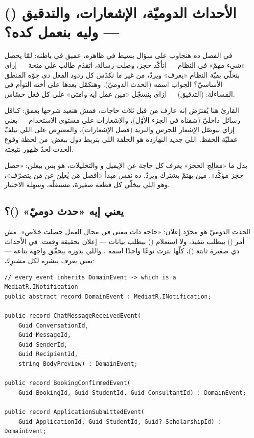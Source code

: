 \section{الأحداث الدوميّة، الإشعارات، والتدقيق () — وليه بنعمل كده؟}

في الفصل ده هنجاوب على سؤال بسيط في ظاهره، عميق في باطنه: لمّا يحصل «شيء مهمّ» في
النظام — اتأكّد حجز، وصلت رسالة، اتقدّم طالب على منحة — إزاي بنخلّي بقيّة النظام
«يعرف» ويردّ، من غير ما نكدّس كل ردود الفعل دي جوّه المنطق الأساسيّ؟ الجواب اسمه
 (الحدث الدوميّ). وهنكمّل بعدها على أخته التوأم في المساءلة:
 (التدقيق) — إزاي بنسجّل «مين عمل إيه وامتى» على كل فعل حسّاس.

القارئ هنا يُفترَض إنه عارف من قبل ثلاث حاجات، فمش هنعيد شرحها بعمق: 
كناقل رسائل داخليّ (شفناه في الجزء الأوّل)، والإشعارات على مستوى الاستخدام —
يعني إزاي  بيوصّل الإشعار للجرس والبريد (فصل الإشعارات)،
والمعترِض على  اللي بيلفّ عمليّة الحفظ. اللي جديد النهارده هو
الحلقة اللي بتربط دول ببعض: من لحظة وقوع الحدث لحدّ ظهور نتيجته.

\begin{idea}
بدل ما «معالِج الحجز» يعرف كل حاجة عن الإيميل و والتحليلات، هو بس
بيعلن: «حصل حجز مؤكَّد». مين يهتمّ يشترك ويردّ. ده نفس مبدأ «افصل مَن يُعلِن
عن مَن يتصرّف»، وهو اللي بيخلّي كل قطعة صغيرة، مستقلّة، وسهلة الاختبار.
\end{idea}

\subsection{يعني إيه «حدث دوميّ» ()؟}

الحدث الدوميّ هو مجرّد إعلان: «حاجة ذات معنى في مجال العمل حصلت خلاص». مش أمر
() بيطلب تنفيذ، ولا استعلام () بيطلب بيانات — إعلان بحقيقة
وقعت. في  الأحداث دي  صغيرة ثابتة ()،
كلّها بترث نوعًا واحدًا اسمه ، واللي بدوره بيحقّق واجهة
 بتاعة  — يعني  يعرف ينشره لكل مشترِك:

\begin{english}
\begin{lstlisting}[language={[Sharp]C}]
// every event inherits DomainEvent -> which is a MediatR.INotification
public abstract record DomainEvent : MediatR.INotification;

public record ChatMessageReceivedEvent(
    Guid ConversationId,
    Guid MessageId,
    Guid SenderId,
    Guid RecipientId,
    string BodyPreview) : DomainEvent;

public record BookingConfirmedEvent(
    Guid BookingId, Guid StudentId, Guid ConsultantId) : DomainEvent;

public record ApplicationSubmittedEvent(
    Guid ApplicationId, Guid StudentId, Guid? ScholarshipId) : DomainEvent;
\end{lstlisting}
\end{english}

